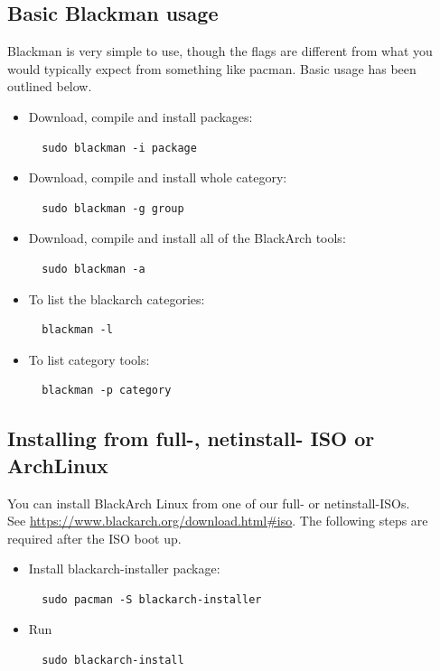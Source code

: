 \documentclass[a4paper, oneside, 11pt]{book}
\begin{document}
\subsection{Basic Blackman usage} Blackman is very simple to use, though the flags are different from what you
would typically expect from something like pacman. Basic usage has been outlined below.
\begin{itemize}
\item Download, compile and install packages:
\begin{lstlisting}
  sudo blackman -i package
\end{lstlisting}

\item Download, compile and install whole category:
\begin{lstlisting}
  sudo blackman -g group
\end{lstlisting}

\item Download, compile and install all of the BlackArch tools:
\begin{lstlisting}
  sudo blackman -a
\end{lstlisting}

\item To list the blackarch categories:
\begin{lstlisting}
  blackman -l
\end{lstlisting}

\item To list category tools:
\begin{lstlisting}
  blackman -p category
\end{lstlisting}

\end{itemize}

\subsection{Installing from full-, netinstall- ISO or ArchLinux}
You can install BlackArch Linux from one of our full- or netinstall-ISOs.\\See
\url{https://www.blackarch.org/download.html#iso}. The following steps are
required after the ISO boot up.
\begin{itemize}
\item Install blackarch-installer package:
\begin{lstlisting}
  sudo pacman -S blackarch-installer
\end{lstlisting}

\item Run
\begin{lstlisting}
  sudo blackarch-install
\end{lstlisting}

\end{itemize}
\end{document}
